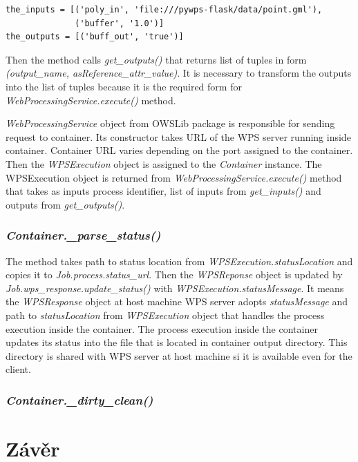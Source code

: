 \documentclass[12pt,a4paper]{article}
\newcommand{\necislovana}[1]{%
\phantomsection
\addcontentsline{toc}{section}{#1}



\section*{#1}
\markboth{\uppercase{#1}}{}
}
\begin{document}
\begin{lstlisting}[basicstyle=\small,caption={\textit{get\_inputs} return value},label={lst:Container.get_inputs}]
the_inputs = [('poly_in', 'file:///pywps-flask/data/point.gml'),
              ('buffer', '1.0')]
the_outputs = [('buff_out', 'true')]
\end{lstlisting}

Then the method calls \textit{get\_outputs()} that returns list of tuples in form \textit{(output\_name, asReference\_attr\_value)}. It is 
necessary to transform the outputs into the list of tuples because it is the required form for \textit{WebProcessingService.execute()} method. 

\textit{WebProcessingService} object from OWSLib package is responsible for sending request to container. Its constructor takes URL of the
WPS server running inside container. Container URL varies depending on the port assigned to the container. Then the \textit{WPSExecution}
object is assigned to the \textit{Container} instance. The WPSExecution object is returned from \textit{WebProcessingService.execute()} 
method that takes as inputs process identifier, list of inputs from \textit{get\_inputs()} and outputs from \textit{get\_outputs()}.

\subsubsection{\textit{Container.\_parse\_status()}}
The method takes path to status location from \textit{WPSExecution.statusLocation} and copies it to \textit{Job.process.status\_url}.
Then the \textit{WPSReponse} object is updated by \textit{Job.wps\_response.update\_status()} with \textit{WPSExecution.statusMessage}.
It means the \textit{WPSResponse} object at host machine WPS server adopts \textit{statusMessage} and path to \textit{statusLocation}
from \textit{WPSExecution} object that handles the process execution inside the container. The process execution inside the container
updates its status into the file that is located in container output directory. This directory is shared with WPS server at host machine
si it is available even for the client.

\subsubsection{\textit{Container.\_dirty\_clean()}}




\newpage
\necislovana{Závěr}
\end{document}
